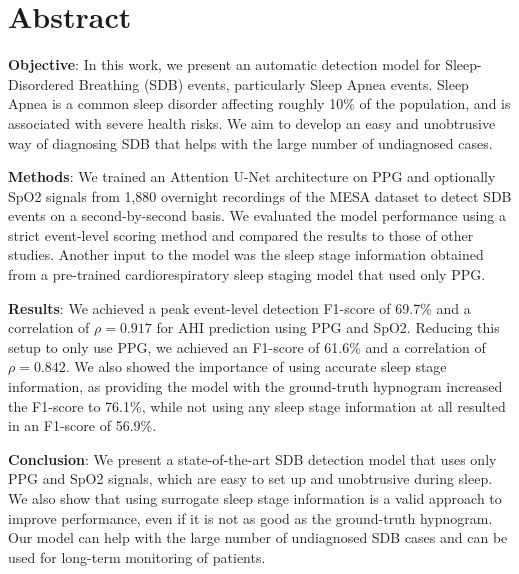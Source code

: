 \chapter*{Abstract}

\textbf{Objective}: In this work, we present an automatic detection model for Sleep-Disordered Breathing (SDB) events, particularly Sleep Apnea events. Sleep Apnea is a common sleep disorder affecting roughly 10\% of the population, and is associated with severe health risks. We aim to develop an easy and unobtrusive way of diagnosing SDB that helps with the large number of undiagnosed cases.

\noindent\textbf{Methods}: We trained an Attention U-Net architecture on PPG and optionally SpO2 signals from 1,880 overnight recordings of the MESA dataset to detect SDB events on a second-by-second basis. We evaluated the model performance using a strict event-level scoring method and compared the results to those of other studies. Another input to the model was the sleep stage information obtained from a pre-trained cardiorespiratory sleep staging model that used only PPG.

\noindent\textbf{Results}: We achieved a peak event-level detection F1-score of 69.7\% and a correlation of $\rho = 0.917$ for AHI prediction using PPG and SpO2. Reducing this setup to only use PPG, we achieved an F1-score of 61.6\% and a correlation of $\rho = 0.842$. We also showed the importance of using accurate sleep stage information, as providing the model with the ground-truth hypnogram increased the F1-score to 76.1\%, while not using any sleep stage information at all resulted in an F1-score of 56.9\%.

\noindent\textbf{Conclusion}: We present a state-of-the-art SDB detection model that uses only PPG and SpO2 signals, which are easy to set up and unobtrusive during sleep. We also show that using surrogate sleep stage information is a valid approach to improve performance, even if it is not as good as the ground-truth hypnogram. Our model can help with the large number of undiagnosed SDB cases and can be used for long-term monitoring of patients.
